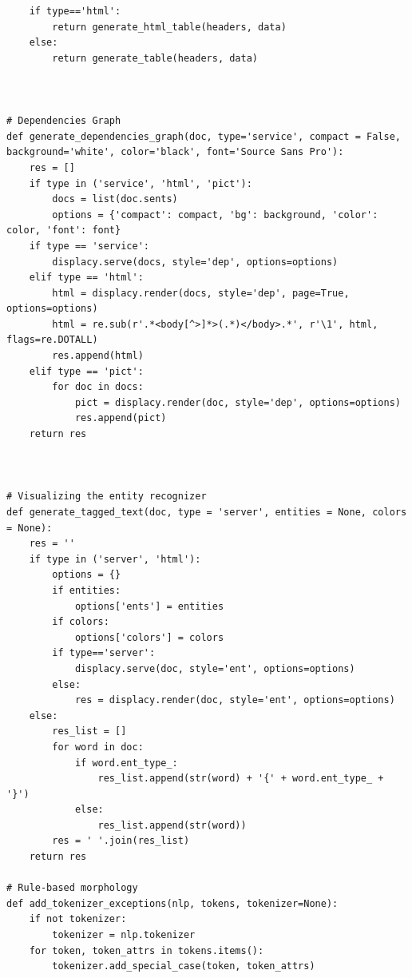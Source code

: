\documentclass[12pt]{article}
\begin{document}
\begin{verbatim}
    if type=='html':
        return generate_html_table(headers, data)
    else:
        return generate_table(headers, data)



# Dependencies Graph
def generate_dependencies_graph(doc, type='service', compact = False, background='white', color='black', font='Source Sans Pro'):
    res = []
    if type in ('service', 'html', 'pict'):
        docs = list(doc.sents)
        options = {'compact': compact, 'bg': background, 'color': color, 'font': font}
    if type == 'service':
        displacy.serve(docs, style='dep', options=options)
    elif type == 'html':
        html = displacy.render(docs, style='dep', page=True, options=options)
        html = re.sub(r'.*<body[^>]*>(.*)</body>.*', r'\1', html, flags=re.DOTALL)
        res.append(html)
    elif type == 'pict':
        for doc in docs:
            pict = displacy.render(doc, style='dep', options=options)
            res.append(pict)
    return res



# Visualizing the entity recognizer
def generate_tagged_text(doc, type = 'server', entities = None, colors = None):
    res = ''
    if type in ('server', 'html'):
        options = {}
        if entities:
            options['ents'] = entities
        if colors:
            options['colors'] = colors
        if type=='server':
            displacy.serve(doc, style='ent', options=options)
        else:
            res = displacy.render(doc, style='ent', options=options)
    else:
        res_list = []
        for word in doc:
            if word.ent_type_:
                res_list.append(str(word) + '{' + word.ent_type_ + '}')
            else:
                res_list.append(str(word))
        res = ' '.join(res_list)
    return res

# Rule-based morphology
def add_tokenizer_exceptions(nlp, tokens, tokenizer=None):
    if not tokenizer:
        tokenizer = nlp.tokenizer
    for token, token_attrs in tokens.items():
        tokenizer.add_special_case(token, token_attrs)
\end{verbatim}

\newpage
\end{document}
